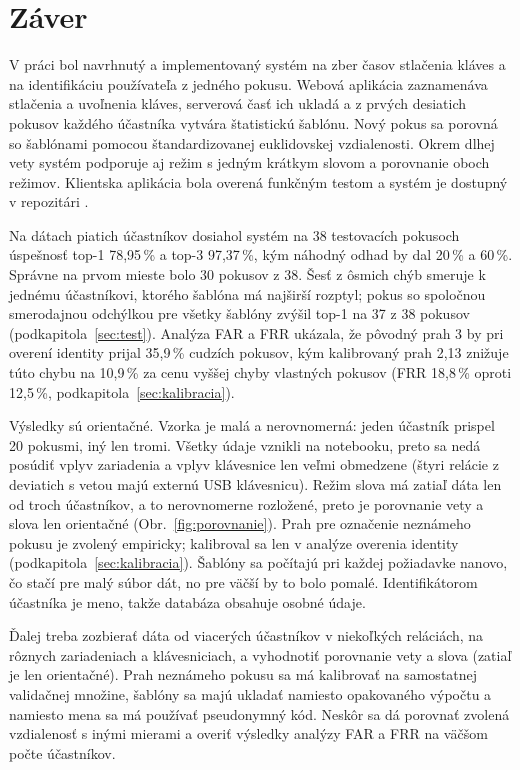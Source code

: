 \section{Záver}

V práci bol navrhnutý a implementovaný systém na zber časov stlačenia kláves
a na identifikáciu používateľa z jedného pokusu. Webová aplikácia zaznamenáva
stlačenia a uvoľnenia kláves, serverová časť ich ukladá a z prvých desiatich
pokusov každého účastníka vytvára štatistickú šablónu. Nový pokus sa porovná
so šablónami pomocou štandardizovanej euklidovskej vzdialenosti. Okrem dlhej vety
systém podporuje aj režim s jedným krátkym slovom a porovnanie oboch režimov.
Klientska aplikácia bola overená funkčným testom a systém je dostupný
v repozitári \cite{repo}.

Na dátach piatich účastníkov dosiahol systém na 38 testovacích pokusoch
úspešnosť top-1 78,95\,\% a top-3 97,37\,\%, kým náhodný odhad by dal 20\,\%
a 60\,\%. Správne na prvom mieste bolo 30 pokusov z 38. Šesť z ôsmich chýb
smeruje k jednému účastníkovi, ktorého šablóna má najširší rozptyl; pokus
so spoločnou smerodajnou odchýlkou pre všetky šablóny zvýšil top-1 na 37
z 38 pokusov (podkapitola~\ref{sec:test}). Analýza FAR a FRR ukázala, že pôvodný
prah 3 by pri overení identity prijal 35,9\,\% cudzích pokusov, kým kalibrovaný
prah 2,13 znižuje túto chybu na 10,9\,\% za cenu vyššej chyby vlastných pokusov
(FRR 18,8\,\% oproti 12,5\,\%, podkapitola~\ref{sec:kalibracia}).

Výsledky sú orientačné. Vzorka je malá a nerovnomerná: jeden účastník prispel
20 pokusmi, iný len tromi. Všetky údaje vznikli na notebooku, preto sa nedá
posúdiť vplyv zariadenia a vplyv klávesnice len veľmi obmedzene (štyri relácie
z deviatich s vetou majú externú USB klávesnicu). Režim slova má zatiaľ dáta len od troch účastníkov, a to nerovnomerne rozložené, preto
je porovnanie vety a slova len orientačné (Obr.~\ref{fig:porovnanie}). Prah pre označenie neznámeho pokusu je
zvolený empiricky; kalibroval sa len v analýze overenia identity
(podkapitola~\ref{sec:kalibracia}). Šablóny sa
počítajú pri každej požiadavke nanovo, čo stačí pre malý súbor dát, no pre
väčší by to bolo pomalé. Identifikátorom účastníka je meno, takže databáza
obsahuje osobné údaje.

Ďalej treba zozbierať dáta od viacerých účastníkov v niekoľkých reláciách, na
rôznych zariadeniach a klávesniciach, a vyhodnotiť porovnanie vety a slova
(zatiaľ je len orientačné). Prah neznámeho pokusu sa má kalibrovať na samostatnej
validačnej množine, šablóny sa majú ukladať namiesto opakovaného výpočtu
a namiesto mena sa má používať pseudonymný kód. Neskôr sa dá porovnať zvolená
vzdialenosť s inými mierami a overiť výsledky analýzy FAR a FRR na väčšom počte
účastníkov.
